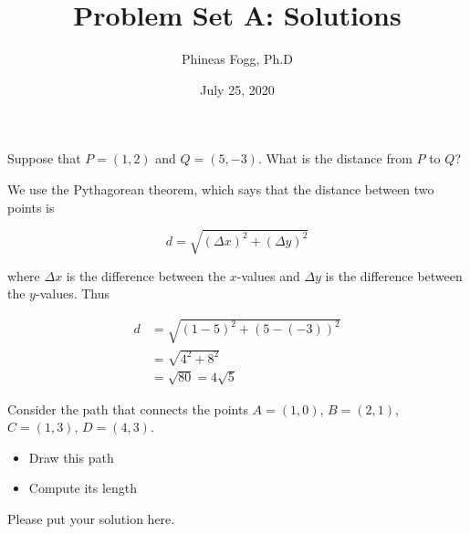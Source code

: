
\title{Problem Set A: Solutions}
\author{Phineas Fogg, Ph.D}
\date{July 25, 2020}


\maketitle


\begin{problem}
Suppose that $P = (1,2)$ and $Q = (5,-3)$.  What is the distance from $P$ to $Q$?
\end{problem}

\begin{solution}
We use the Pythagorean theorem, which says that the distance between two points is

\begin{equation}
d = \sqrt{(\Delta x)^2 + (\Delta y)^2}
\end{equation}

where $\Delta x$ is the difference between the $x$-values and $\Delta y$ is the difference between the $y$-values.  Thus

\begin{align}
d &= \sqrt{(1 - 5)^2 + (5 - (-3))^2} \\
  &= \sqrt{4^2 + 8^2} \\
  &= \sqrt{80} = 4\sqrt{5}
\end{align}

\end{solution}

\begin{problem}
Consider the path that connects the points $A = (1,0)$,
$B = (2,1)$, $C = (1,3)$, $D = (4,3)$.

\medskip
\begin{itemize}
\item Draw this path
\item Compute its length
\end{itemize}
\end{problem}

\begin{solution}
Please put your solution here.
\end{solution}


